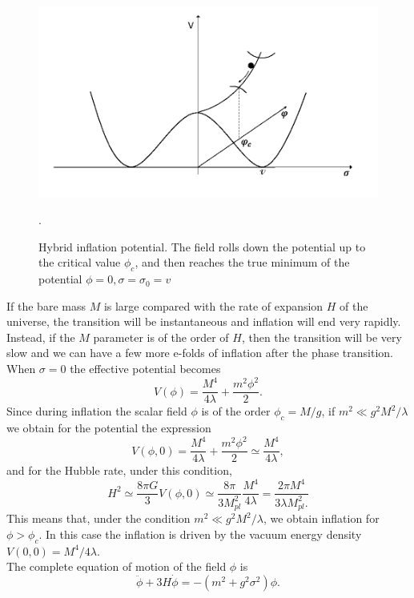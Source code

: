 \documentclass[11pt,a4paper,twoside]{book}
\begin{document}
 \begin{figure}
 	\centering
 	\includegraphics[width=0.55\linewidth, height=0.25\textheight]{Images/Chap2/HybridModel_GWFromInflation_Fig4}
 	\caption{Hybrid inflation potential. The field rolls down the potential up to the critical value $\phi_{c}$, and then reaches the true minimum of the potential $ \phi=0,\sigma=\sigma_{0}=v$ \cite{GWFromInflation:Intro}}
 	\label{fig:hybridmodelgwfrominflationfig4}.
 \end{figure} 
 If the bare mass $ M $ is large compared with the rate of expansion $H$ of the universe, the transition will be instantaneous and inflation will end very rapidly. Instead, if the $ M $ parameter is of the order of $ H $, then the transition will be very slow and we can have a few more e-folds of inflation after the phase transition. When $ \sigma=0 $ the effective potential becomes
 \begin{equation}
 \label{effectivePotential}
 V(\phi)=\frac{M^{4}}{4\lambda} +  \frac{m^{2} \phi^{2}}{2}.
 \end{equation}
Since during inflation the scalar field $\phi$ is of the order $\phi_{c}=M/g$, if $ m^{2} \ll g^{2}M^{2}/\lambda $ we obtain for the potential the expression
\begin{equation}
	\label{potential}
	V(\phi,0)=\frac{M^{4}}{4\lambda} +  \frac{m^{2} \phi^{2}}{2} \simeq \frac{M^{4}}{4\lambda},
\end{equation} 
and for the Hubble rate, under this condition,
\begin{equation}
	\label{Chap2:HubbleHybrid}
	H^{2}\simeq\frac{8\pi G}{3} V(\phi,0) \simeq \frac{8\pi }{3M_{pl}^{2}}\frac{M^{4}}{4\lambda} =\frac{2\pi M^{4}}{3\lambda M_{pl}^{2}.}
\end{equation}
This means that, under the condition $  m^{2} \ll g^{2}M^{2}/\lambda $, we obtain inflation for $ \phi > \phi_{c} $. In this case the inflation is driven by the vacuum energy density $ V(0,0) = M^{4}/4\lambda $.\\
The complete equation of motion of the field $\phi$ is
\begin{equation}
	\ddot{\phi} + 3H\dot{\phi}=-(m^{2} + g^{2}\sigma^{2})\phi.
\end{equation}
\end{document}
